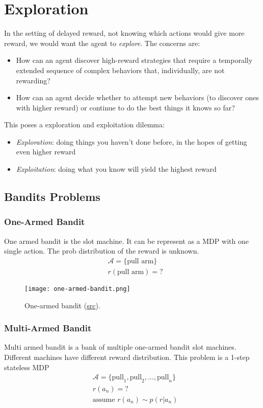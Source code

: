 \chapter{Exploration}

In the setting of delayed reward, not knowing which actions would give more reward, we would want the agent to \textit{explore}. The concerns are:
\begin{itemize}
	\item How can an agent discover high-reward strategies that require a temporally extended sequence of complex behaviors that, individually, are not rewarding?
	\item How can an agent decide whether to attempt new behaviors (to discover ones with higher reward) or continue to do the best things it knows so far?
\end{itemize}
This poses a exploration and exploitation dilemma:
\begin{itemize}
	\item \textit{Exploration}: doing things you haven't done before, in the hopes of getting even higher reward
	\item \textit{Exploitation}: doing what you know will yield the highest reward
\end{itemize}

\section{Bandits Problems}
\subsection{One-Armed Bandit}
One armed bandit is the slot machine. It can be represent as a \ac{MDP} with one single action. The \ac{prob} distribution of the reward is unknown.
\begin{align}
	&\mathcal{A} = \{\text{pull arm}\}\\
	&r(\text{pull arm}) = ?
\end{align}

\begin{figure}[hbt!]
	\centering
	\texttt{[image: one-armed-bandit.png]}
	\caption{One-armed bandit (\href{https://www.amazon.com/Armed-Bandit-Slot-Machine-Bank/dp/B001KYV9DW}{src}).}
\end{figure}

\subsection{Multi-Armed Bandit}
Multi armed bandit is a bank of multiple one-armed bandit slot machines. Different machines have different reward distribution. This problem is a 1-step stateless \ac{MDP}
\begin{align}
	&\mathcal{A} = \{\text{pull}_1, \text{pull}_2, \dots, \text{pull}_n\}\\
	&r(a_n) = ?\\
	&\text{assume } r(a_n) \sim p(r|a_n)
\end{align}

